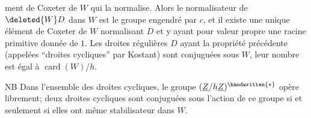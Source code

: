ment de Coxeter de $W$ qui la normalise. Alors le normalisateur de $\deleted{W}D$ dans $W$ est le groupe engendré par $c$, et il existe une unique élément de Coxeter de $W$ normalisant $D$ et y ayant pour valeur propre une racine primitive  donnée de $1$. Les droites régulières $D$ ayant la propriété précédente (appelées ``droites cycliques'' par Kostant) sont conjuguées sous $W$, leur nombre est égal à $\operatorname{card}(W)/h$.

NB Dans l'ensemble des droites cycliques, le groupe $(\underline{Z}/h\underline{Z})^{\handwritten{*}}$ opère librement; deux droites cycliques sont conjuguées sous l'action de ce groupe si et seulement si elles ont même stabilisateur dans $W$.
